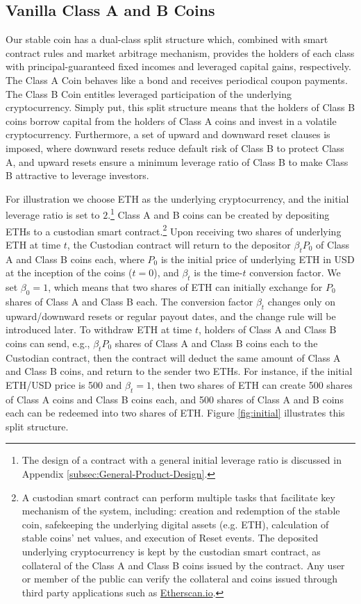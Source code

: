 \documentclass[11pt]{article}%
\numberwithin{equation}{section}
\theoremstyle{plain}
\begin{document}
\subsection{Vanilla Class A and B Coins}\label{subsect:vanilla}

Our stable coin has a dual-class split structure which, combined with smart contract rules and market arbitrage mechanism, provides the holders of each class with principal-guaranteed fixed incomes and leveraged capital gains, respectively. The Class A Coin behaves like a bond and receives periodical coupon payments. The Class B Coin entitles leveraged participation of the underlying cryptocurrency. Simply put, this split structure means that the holders of Class B coins borrow capital from the holders of Class A coins and invest in a volatile cryptocurrency. Furthermore, a set of upward and downward reset clauses is imposed, where downward resets reduce default risk of Class B to protect Class A, and upward resets ensure a minimum leverage ratio of Class B to make Class B attractive to leverage investors.

For illustration we choose ETH as the underlying cryptocurrency, and the initial leverage ratio is set to $2$.\footnote{The design of a contract with a general initial leverage ratio is discussed in Appendix \ref{subsec:General-Product-Design}.} Class A and B coins can be created by depositing ETHs to a custodian smart contract.\footnote{A custodian smart contract can perform multiple tasks that facilitate key mechanism of the system, including: creation and redemption of the stable coin, safekeeping the underlying digital assets (e.g. ETH), calculation of stable coins' net values, and execution of Reset events. The deposited underlying cryptocurrency is kept by the custodian smart contract, as collateral of the Class A and Class B coins issued by the contract. Any user or member of the public can verify the collateral and coins issued through third party applications such as \href{http://etherscan.io}{Etherscan.io}.} Upon receiving two shares of underlying ETH at time $t$, the Custodian contract will return to the depositor $\beta_t P_0 $ of Class A and Class B coins each, where $P_{0}$ is the initial price of underlying ETH in USD at the inception of the coins ($t=0$), and $\beta_t$ is the time-$t$ conversion factor. We set $\beta_0=1$, which means that two shares of ETH can initially exchange for $P_0$ shares of Class A and Class B each. The conversion factor $\beta_t$ changes only on upward/downward resets or regular payout dates, and the change rule will be introduced later. To withdraw ETH at time $t$, holders of Class A and Class B coins can send, e.g., $\beta_t P_0$ shares of Class A and Class B coins each to the Custodian contract, then the contract will deduct the same amount of Class A and Class B coins, and return to the sender two ETHs.
For instance, if the initial ETH/USD price is 500 and $\beta_t=1$, then two shares of ETH can create 500 shares of Class A coins and Class B coins each, and 500 shares of Class A and B coins each can be redeemed into two shares of ETH. Figure \ref{fig:initial} illustrates this split structure.
\end{document}
